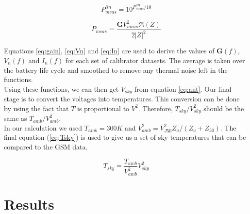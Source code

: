 \documentclass[9pt]{article}
\begin{document}
\begin{center}
\begin{equation} \label{eq:dB}
P^{lin}_{meas} = 10^{P^{dB}_{meas}/10}
\end{equation}

\begin{equation} \label{eq:power}
P_{meas} = \frac{\mathbf{G}V_{meas}^2 \Re (Z)}{2 |Z|^2}
\end{equation}
\end{center}


Equations \ref{eq:gain}, \ref{eq:Vn} and \ref{eq:In} are used to derive the values of $\mathbf{G}(f)$, $V_n(f)$ and $I_n(f)$ for each set of calibrator datasets. The average is taken over the battery life cycle and smoothed to remove any thermal noise left in the functions. \\

Using these functions, we can then get $V_{sky}$ from equation \ref{eq:ant}. Our final stage is to convert the voltages into temperatures. This conversion can be done by using the fact that $T$ is proportional to $V^2$. Therefore, $T_{sky}/{V_{sky}^2}$ should be the same as $T_{amb}/V_{amb}^2$. \\

In our calculation we used $T_{amb} = 300 K$ and $V_{amb}^2 = V_{J50}^2 Z_a/(Z_a+Z_{50})$. The final equation (\ref{eq:Tsky}) is used to give us a set of sky temperatures that can be compared to the GSM data. 

\begin{center}
\begin{equation} \label{eq:Tsky}
T_{sky} = \frac{T_{amb}}{V_{amb}^2} V_{sky}^2
\end{equation}
\end{center}

\section{Results}
\end{document}
